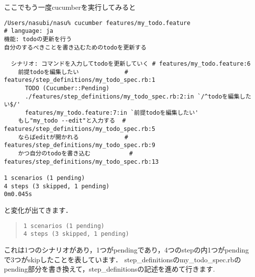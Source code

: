 ここでもう一度cucumberを実行してみると
\begin{lstlisting}[style=customCsh]
/Users/nasubi/nasu% cucumber features/my_todo.feature 
# language: ja
機能: todoの更新を行う
自分のするべきことを書き込むためのtodoを更新する

  シナリオ: コマンドを入力してtodoを更新していく # features/my_todo.feature:6
    前提todoを編集したい             # features/step_definitions/my_todo_spec.rb:1
      TODO (Cucumber::Pending)
      ./features/step_definitions/my_todo_spec.rb:2:in `/^todoを編集したい$/'
      features/my_todo.feature:7:in `前提todoを編集したい'
    もし"my_todo --edit"と入力する  # features/step_definitions/my_todo_spec.rb:5
    ならばeditが開かれる             # features/step_definitions/my_todo_spec.rb:9
    かつ自分のtodoを書き込む           # features/step_definitions/my_todo_spec.rb:13

1 scenarios (1 pending)
4 steps (3 skipped, 1 pending)
0m0.045s

\end{lstlisting}
と変化が出てきます．
\begin{quote}\begin{verbatim}
1 scenarios (1 pending)
4 steps (3 skipped, 1 pending)
\end{verbatim}\end{quote}
これは1つのシナリオがあり，1つがpendingであり，4つのstepの内1つがpendingで3つがskipしたことを表しています．
step\_definitionsのmy\_todo\_spec.rbのpending部分を書き換えて，step\_definitionsの記述を進めて行きます.

